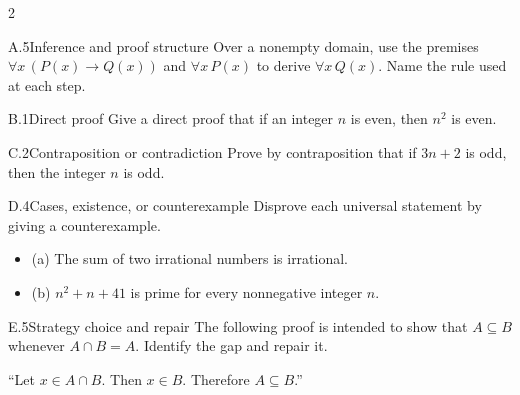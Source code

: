 \documentclass[9pt]{extarticle}
\begin{document}
\begin{multicols}{2}
\begin{CoreProblem}{A.5}{Inference and proof structure}
Over a nonempty domain, use the premises
$\forall x\,(P(x)\to Q(x))$ and $\forall x\,P(x)$ to derive
$\forall x\,Q(x)$. Name the rule used at each step.
\end{CoreProblem}
\begin{CoreProblem}{B.1}{Direct proof}
Give a direct proof that if an integer $n$ is even, then $n^2$ is even.
\end{CoreProblem}
\begin{CoreProblem}{C.2}{Contraposition or contradiction}
Prove by contraposition that if $3n+2$ is odd, then the integer $n$ is odd.
\end{CoreProblem}
\columnbreak
\begin{CoreProblem}{D.4}{Cases, existence, or counterexample}
Disprove each universal statement by giving a counterexample.
\begin{itemize}
  \item (a) The sum of two irrational numbers is irrational.
  \item (b) $n^2+n+41$ is prime for every nonnegative integer $n$.
\end{itemize}
\end{CoreProblem}
\begin{CoreProblem}{E.5}{Strategy choice and repair}
The following proof is intended to show that $A\subseteq B$ whenever
$A\cap B=A$. Identify the gap and repair it.

``Let $x\in A\cap B$. Then $x\in B$. Therefore $A\subseteq B$.''
\end{CoreProblem}
\end{multicols}
\CoreWorkArea
\FormBreak
{}
\end{document}
